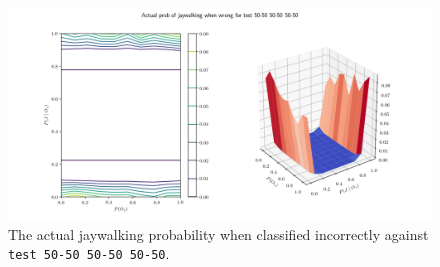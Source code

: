 \documentclass[]{report}
\newcommand{\code}{\texttt}
\begin{document}
\begin{figure}[h]
    \centering
    \centerline{\includegraphics[scale=0.55]{test_50-50_50-50_50-50_jay_prob.png}}
    \caption[]{The actual jaywalking probability when classified incorrectly against \code{test 50-50 50-50 50-50}.}
    \label{fig:test_50-50_50-50_50-50_jay_prob_plot}
\end{figure}
\end{document}
